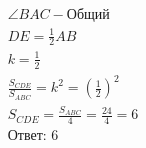 \begin{tcolorbox}[
  colback=white!100!white,
  colframe=green!75!black,
  title=Решение 1.3
]
\begin{equation*}
  \begin{array}{l}
    \angle BAC - \text{Общий}                                  \\
    DE = \frac{1}{2} AB                                        \\
    k = \frac{1}{2}                                            \\
    \frac{S_{CDE}}{S_{ABC}} = k^2 = \left(\frac{1}{2}\right)^2 \\
    S_{CDE} = \frac{S_{ABC}}{4} = \frac{24}{4} = 6             \\
    \text{Ответ: } 6                                           \\
  \end{array}
\end{equation*}

\end{tcolorbox}

